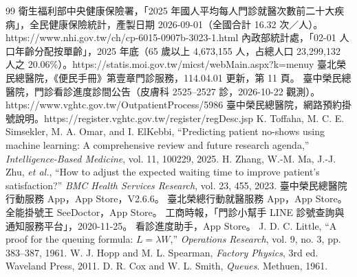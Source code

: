 \documentclass[11pt,twocolumn]{article}
\begin{document}
\begin{thebibliography}{99}
 衛生福利部中央健康保險署，「2025 年國人平均每人門診就醫次數前二十大疾病」，全民健康保險統計，產製日期 2026-09-01（全國合計 16.32 次／人）。https://www.nhi.gov.tw/ch/cp-6015-0907b-3023-1.html
 內政部統計處，「02-01 人口年齡分配按單齡」，2025 年底（65 歲以上 4,673,155 人，占總人口 23,299,132 人之 20.06\%）。https://statis.moi.gov.tw/micst/webMain.aspx?k=menuy
 臺北榮民總醫院，《便民手冊》第壹章門診服務，114.04.01 更新，第 11 頁。
 臺中榮民總醫院，門診看診進度診間公告（皮膚科 2525--2527 診，2026-10-22 觀測）。https://www.vghtc.gov.tw/OutpatientProcess/5986
 臺中榮民總醫院，網路預約掛號說明。https://register.vghtc.gov.tw/register/regDesc.jsp
 K. Toffaha, M. C. E. Simsekler, M. A. Omar, and I. ElKebbi, ``Predicting patient no-shows using machine learning: A comprehensive review and future research agenda,'' \textit{Intelligence-Based Medicine}, vol. 11, 100229, 2025.
 H. Zhang, W.-M. Ma, J.-J. Zhu, \textit{et al.}, ``How to adjust the expected waiting time to improve patient's satisfaction?'' \textit{BMC Health Services Research}, vol. 23, 455, 2023.
 臺中榮民總醫院行動服務 App，App Store，V2.6.6。
 臺北榮總行動就醫服務 App，App Store。
 全能掛號王 SeeDoctor，App Store。
 工商時報，「門診小幫手 LINE 診號查詢與通知服務平台」，2020-11-25。
 看診進度助手，App Store。
 J. D. C. Little, ``A proof for the queuing formula: $L=\lambda W$,'' \textit{Operations Research}, vol. 9, no. 3, pp. 383--387, 1961.
 W. J. Hopp and M. L. Spearman, \textit{Factory Physics}, 3rd ed. Waveland Press, 2011.
 D. R. Cox and W. L. Smith, \textit{Queues}. Methuen, 1961.
\end{thebibliography}
\end{document}
